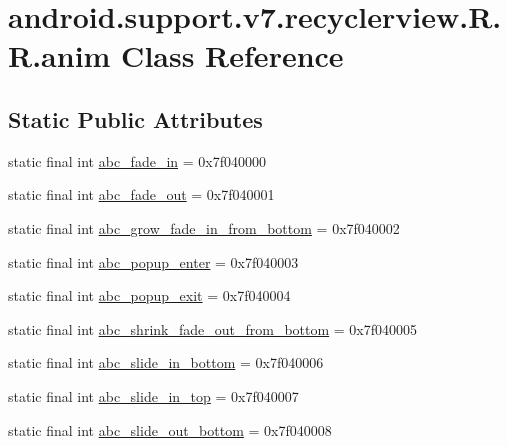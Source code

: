 \hypertarget{classandroid_1_1support_1_1v7_1_1recyclerview_1_1_r_1_1anim}{
\section{android.support.v7.recyclerview.R.R.anim Class Reference}
\label{classandroid_1_1support_1_1v7_1_1recyclerview_1_1_r_1_1anim}
}
\subsection*{Static Public Attributes}
\begin{CompactItemize}
\item 
static final int \hyperlink{classandroid_1_1support_1_1v7_1_1recyclerview_1_1_r_1_1anim_56b3ebf55e3eab4b66db01a7f3094d6f}{abc\_\-fade\_\-in} = 0x7f040000
\item 
static final int \hyperlink{classandroid_1_1support_1_1v7_1_1recyclerview_1_1_r_1_1anim_8041208c31acbd67dd454cf09f706694}{abc\_\-fade\_\-out} = 0x7f040001
\item 
static final int \hyperlink{classandroid_1_1support_1_1v7_1_1recyclerview_1_1_r_1_1anim_1f0927c212094726458b268fe03bde2b}{abc\_\-grow\_\-fade\_\-in\_\-from\_\-bottom} = 0x7f040002
\item 
static final int \hyperlink{classandroid_1_1support_1_1v7_1_1recyclerview_1_1_r_1_1anim_074df337d8bf96157d927fcf6243f09f}{abc\_\-popup\_\-enter} = 0x7f040003
\item 
static final int \hyperlink{classandroid_1_1support_1_1v7_1_1recyclerview_1_1_r_1_1anim_e115955105590c38859f6204b22675b9}{abc\_\-popup\_\-exit} = 0x7f040004
\item 
static final int \hyperlink{classandroid_1_1support_1_1v7_1_1recyclerview_1_1_r_1_1anim_604f6945a6cded1e573ec4af8d465faf}{abc\_\-shrink\_\-fade\_\-out\_\-from\_\-bottom} = 0x7f040005
\item 
static final int \hyperlink{classandroid_1_1support_1_1v7_1_1recyclerview_1_1_r_1_1anim_07f0f0c8a0929eeca4135c838507ef42}{abc\_\-slide\_\-in\_\-bottom} = 0x7f040006
\item 
static final int \hyperlink{classandroid_1_1support_1_1v7_1_1recyclerview_1_1_r_1_1anim_e0ad2bc32445542747c1248ce2817d2e}{abc\_\-slide\_\-in\_\-top} = 0x7f040007
\item 
static final int \hyperlink{classandroid_1_1support_1_1v7_1_1recyclerview_1_1_r_1_1anim_b78189e758b642317a2564d8c43d54ae}{abc\_\-slide\_\-out\_\-bottom} = 0x7f040008

\end{CompactItemize}

